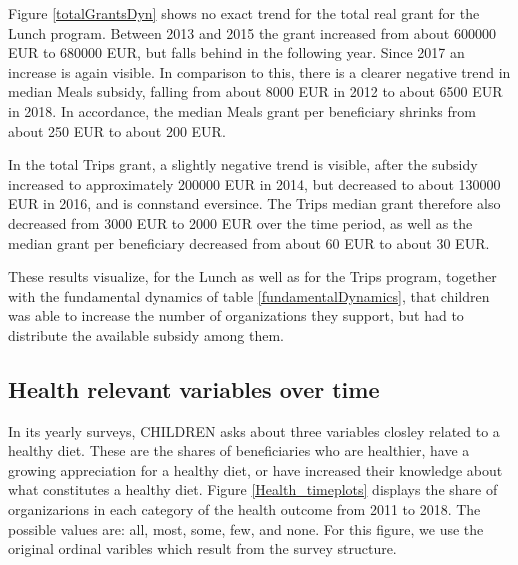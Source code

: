 \documentclass[12pt, a4paper, titlepage]{article}\usepackage[]{graphicx}\usepackage[]{color}
\begin{document}
Figure \ref{totalGrantsDyn} shows no exact trend for the total real grant for the Lunch program. Between 2013 and 2015 the grant increased from about 600000 EUR to 680000 EUR, but falls behind in the following year. Since 2017 an increase is again visible. In comparison to this, there is a clearer negative trend in median Meals subsidy, falling from about 8000 EUR in 2012 to about 6500 EUR in 2018. In accordance, the median Meals grant per beneficiary shrinks from about 250 EUR to about 200 EUR. 

In the total Trips grant, a slightly negative trend is visible, after the subsidy increased to approximately 200000 EUR in 2014, but decreased to about 130000 EUR in 2016, and is connstand eversince. The Trips median grant therefore also decreased from 3000 EUR to 2000 EUR over the time period, as well as the median grant per beneficiary decreased from about 60 EUR to about 30 EUR.

These results visualize, for the Lunch as well as for the Trips program, together with the fundamental dynamics of table \ref{fundamentalDynamics}, that children was able to increase the number of organizations they support, but had to distribute the available subsidy among them. 

\subsection{Health relevant variables over time} 

In its yearly surveys, CHILDREN asks about three variables closley related to a healthy diet. These are the shares of beneficiaries who are healthier, have a growing appreciation for a healthy diet, or have increased their knowledge about what constitutes a healthy diet. Figure \ref{Health_timeplots} displays the share of organizarions in each category of the health outcome from 2011 to 2018. The possible values are: all, most, some, few, and none. For this figure, we use the original ordinal varibles which result from the survey structure.  
\end{document}
